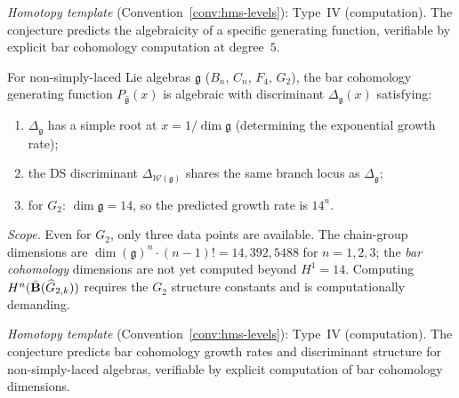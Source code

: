 \begin{remark}[Scope]
\emph{Homotopy template} (Convention~\ref{conv:hms-levels}): Type~IV (computation).
The conjecture predicts the algebraicity of a specific generating function, verifiable by explicit bar cohomology computation at degree~$5$.
\end{remark}

\begin{conjecture}
\label{conj:non-simply-laced-discriminant}
For non-simply-laced Lie algebras $\mathfrak{g}$ ($B_n$, $C_n$, $F_4$, $G_2$), the bar cohomology generating function $P_{\widehat{\mathfrak{g}}}(x)$ is algebraic with discriminant $\Delta_{\mathfrak{g}}(x)$ satisfying:
\begin{enumerate}[label=\textup{(\roman*)}]
\item $\Delta_{\mathfrak{g}}$ has a simple root at $x = 1/\dim\mathfrak{g}$ (determining the exponential growth rate);
\item the DS discriminant $\Delta_{\mathcal{W}(\mathfrak{g})}$ shares the same branch locus as $\Delta_{\mathfrak{g}}$;
\item for $G_2$: $\dim\mathfrak{g} = 14$, so the predicted growth rate is $14^n$.
\end{enumerate}

\emph{Scope.}  Even for $G_2$, only three data points are available.  The chain-group dimensions are $\dim(\mathfrak{g})^n \cdot (n{-}1)! = 14, 392, 5488$ for $n = 1, 2, 3$; the \emph{bar cohomology} dimensions are not yet computed beyond $H^1 = 14$.  Computing $H^n(\bar{\mathbf{B}}(\widehat{G}_{2,k}))$ requires the $G_2$ structure constants and is computationally demanding.
\end{conjecture}

\begin{remark}[Scope]
\emph{Homotopy template} (Convention~\ref{conv:hms-levels}): Type~IV (computation).
The conjecture predicts bar cohomology growth rates and discriminant structure for non-simply-laced algebras, verifiable by explicit computation of bar cohomology dimensions.
\end{remark}


